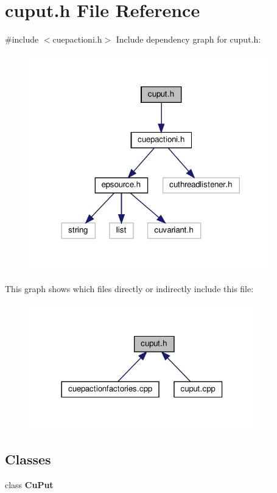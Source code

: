 \section{cuput.\+h File Reference}
\label{cuput_8h}
{\ttfamily \#include $<$cuepactioni.\+h$>$}\newline
Include dependency graph for cuput.\+h\+:\nopagebreak
\begin{figure}[H]
\begin{center}
\leavevmode
\includegraphics[width=299pt]{cuput_8h__incl}
\end{center}
\end{figure}
This graph shows which files directly or indirectly include this file\+:\nopagebreak
\begin{figure}[H]
\begin{center}
\leavevmode
\includegraphics[width=278pt]{cuput_8h__dep__incl}
\end{center}
\end{figure}
\subsection*{Classes}
\begin{DoxyCompactItemize}
\item 
class \textbf{ Cu\+Put}
\end{DoxyCompactItemize}
